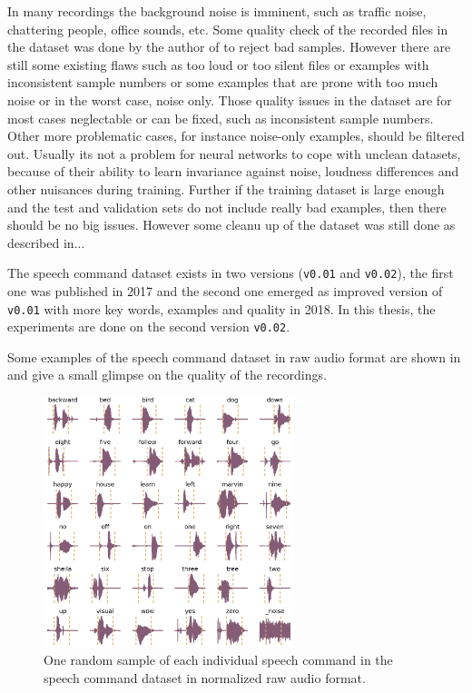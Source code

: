 In many recordings the background noise is imminent, such as traffic noise, chattering people, office sounds, etc.
Some quality check of the recorded files in the dataset was done by the author of \cite{Warden2018} to reject bad samples.
However there are still some existing flaws such as too loud or too silent files or examples with inconsistent sample numbers or some examples that are prone with too much noise or in the worst case, noise only.
Those quality issues in the dataset are for most cases neglectable or can be fixed, such as inconsistent sample numbers. 
Other more problematic cases, for instance noise-only examples, should be filtered out.
Usually its not a problem for neural networks to cope with unclean datasets, because of their ability to learn invariance against noise, loudness differences and other nuisances during training.
Further if the training dataset is large enough and the test and validation sets do not include really bad examples, then there should be no big issues.
However some cleanu up of the dataset was still done as described in...

The speech command dataset exists in two versions (\texttt{v0.01} and \texttt{v0.02}), the first one was published in 2017 and the second one emerged as improved version of \texttt{v0.01} with more key words, examples and quality in 2018.
In this thesis, the experiments are done on the second version \texttt{v0.02}.

Some examples of the speech command dataset in raw audio format are shown in  and give a small glimpse on the quality of the recordings.
\begin{figure}[!ht]
  \centering
    \includegraphics[width=0.65\textwidth]{./5_exp/figs/exp_dataset_wav_grid_speech_commands_v2}
  \caption{One random sample of each individual speech command in the speech command dataset in normalized raw audio format.}
  \label{fig:exp_dataset_wav_grid_speech_commands_v2}
\end{figure}
\FloatBarrier
\noindent

